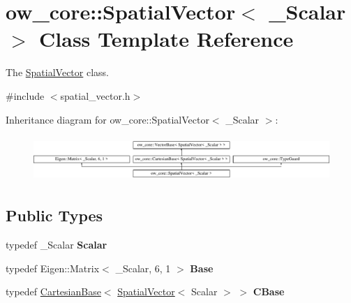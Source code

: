 \hypertarget{classow__core_1_1SpatialVector}{}\section{ow\+\_\+core\+:\+:Spatial\+Vector$<$ \+\_\+\+Scalar $>$ Class Template Reference}
\label{classow__core_1_1SpatialVector}


The \hyperlink{classow__core_1_1SpatialVector}{Spatial\+Vector} class.  




{\ttfamily \#include $<$spatial\+\_\+vector.\+h$>$}

Inheritance diagram for ow\+\_\+core\+:\+:Spatial\+Vector$<$ \+\_\+\+Scalar $>$\+:\begin{figure}[H]
\begin{center}
\leavevmode
\includegraphics[height=1.723077cm]{de/d25/classow__core_1_1SpatialVector}
\end{center}
\end{figure}
\subsection*{Public Types}
\begin{DoxyCompactItemize}
\item 
typedef \+\_\+\+Scalar {\bfseries Scalar}\hypertarget{classow__core_1_1SpatialVector_a0fe22e3ec45faf44dc47cbce361ea960}{}\label{classow__core_1_1SpatialVector_a0fe22e3ec45faf44dc47cbce361ea960}

\item 
typedef Eigen\+::\+Matrix$<$ \+\_\+\+Scalar, 6, 1 $>$ {\bfseries Base}\hypertarget{classow__core_1_1SpatialVector_afdd4fccd2df65de37854db9b7f370049}{}\label{classow__core_1_1SpatialVector_afdd4fccd2df65de37854db9b7f370049}

\item 
typedef \hyperlink{classow__core_1_1CartesianBase}{Cartesian\+Base}$<$ \hyperlink{classow__core_1_1SpatialVector}{Spatial\+Vector}$<$ Scalar $>$ $>$ {\bfseries C\+Base}\hypertarget{classow__core_1_1SpatialVector_a4e15a5608f6dd94d367382761ef7c037}{}\label{classow__core_1_1SpatialVector_a4e15a5608f6dd94d367382761ef7c037}

\end{DoxyCompactItemize}

